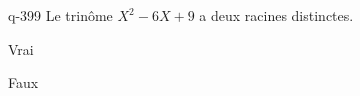 \begin{truefalse}{q-399}
Le trinôme $X^2-6X+9$ a deux racines distinctes.
\item Vrai
\item* Faux
\end{truefalse}


